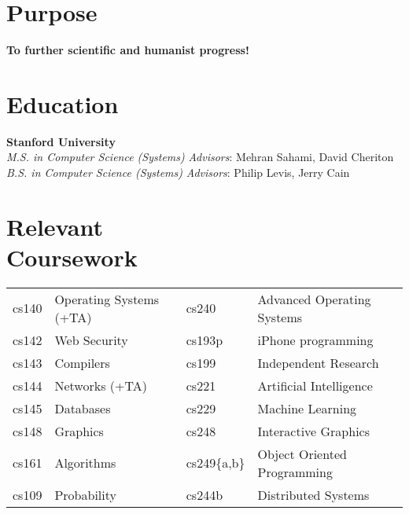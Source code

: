 \documentclass[margin,line]{resume}
\begin{document}
\begin{resume}


    \section{\mysidestyle Purpose}
    \textbf{To further scientific and humanist progress!}


    \section{\mysidestyle Education}

    \textbf{Stanford University} \vspace{2mm}\\\vspace{1mm}%
    \textsl{M.S. in Computer Science (Systems)}  \hfill \emph{Advisors}: Mehran Sahami, David Cheriton\\
    \textsl{B.S. in Computer Science (Systems)}  \hfill \emph{Advisors}: Philip Levis, Jerry Cain

    \section{\mysidestyle Relevant \\ Coursework}
    \begin{tabular}{llll}
cs140  & Operating Systems (+TA) \hspace{0.15\textwidth}
                             &  cs240  & Advanced Operating Systems \\
cs142  & Web Security        &  cs193p & iPhone programming     \\
cs143  & Compilers           &  cs199  & Independent Research    \\
cs144  & Networks (+TA)      &  cs221  & Artificial Intelligence \\
cs145  & Databases           &  cs229  & Machine Learning        \\
cs148  & Graphics            &  cs248  & Interactive Graphics  \\
cs161  & Algorithms          &  cs249\{a,b\} & Object Oriented Programming \\
cs109  & Probability         &  cs244b & Distributed Systems    \\
    \end{tabular}



\end{resume}
\end{document}

